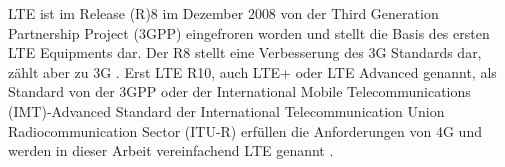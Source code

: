 LTE ist im Release (R)8 im Dezember 2008 von der Third Generation Partnership Project (3GPP)  eingefroren worden und stellt die Basis des ersten LTE Equipments dar. Der R8 stellt eine Verbesserung des 3G Standards dar, zählt aber zu 3G \cite[S. 32ff]{Zoi09}. Erst LTE R10, auch LTE+ oder LTE Advanced genannt, als Standard von der 3GPP oder der International Mobile Telecommunications (IMT)-Advanced Standard der International Telecommunication Union Radiocommunication Sector (ITU-R) erfüllen die Anforderungen von 4G und werden in dieser Arbeit vereinfachend LTE genannt \cite{Wan13}.


%
%



